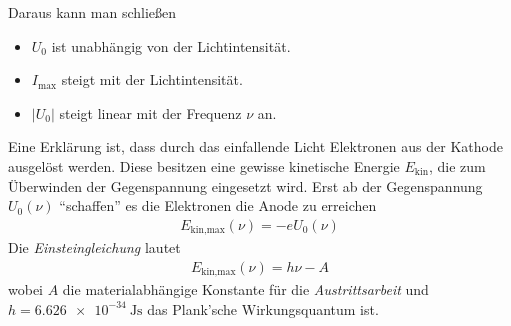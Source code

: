 Daraus kann man schließen
\begin{itemize}
\item $U_0$ ist unabhängig von der Lichtintensität.
\item $I_\text{max}$ steigt mit der Lichtintensität.
\item $|U_0|$ steigt linear mit der Frequenz $\nu$ an.
\end{itemize}
Eine Erklärung ist, dass durch das einfallende Licht Elektronen aus
der Kathode ausgelöst werden. Diese besitzen eine gewisse kinetische
Energie $E_\text{kin}$, die zum Überwinden der Gegenspannung
eingesetzt wird.
Erst ab der Gegenspannung $U_0(\nu)$ \enquote{schaffen} es die
Elektronen die Anode zu erreichen
\begin{gather*}
  E_{\text{kin,max}}(\nu) = -e U_0(\nu)
\end{gather*}
Die \emph{Einsteingleichung} lautet
\begin{gather*}
    E_{\text{kin,max}}(\nu) = h\nu - A
\end{gather*}
wobei 
$A$ 
die materialabhängige Konstante für die \emph{Austrittsarbeit} und
$h=\SI{6.626e-34}{\J\s}$%
das Plank'sche Wirkungsquantum ist.



